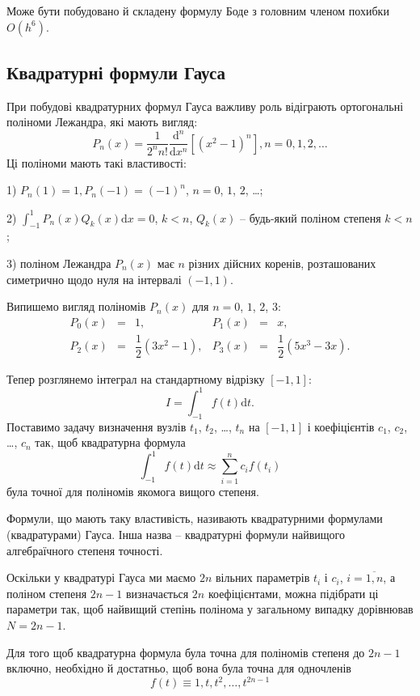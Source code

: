 \documentclass[14pt,twoside]{extreport}
\theoremstyle{mystyle}
\numberwithin{equation}{chapter}
\begin{document}
Може бути побудовано й складену формулу Боде з головним членом похибки $O(h^6)$.

\subsection{Квадратурні формули Гауса}

При побудові квадратурних формул Гауса важливу роль відіграють ортогональні поліноми Лежандра, які мають вигляд:
\[
P_{n}(x)=\frac{1}{2^{n}n!}\frac{\mathrm{d}^{n}}{\mathrm{d}x^{n}}[(x^{2}-1)^{n}], n=0, 1, 2, \ldots
\]
Ці поліноми мають такі властивості:

1) $P_{n}(1)=1, P_{n}(-1)=(-1)^{n}$, $n=0$, $1$, $2$, \ldots;

2) $\displaystyle \int_{-1}^{1}P_{n}(x)Q_{k}(x)\mathrm{d}x=0$, $k<n$, $Q_{k}(x)$ -- будь-який поліном степеня $k<n$;

3) поліном Лежандра $P_n(x)$ має $n$ різних дійсних коренів, розташованих симетрично щодо нуля на інтервалі $(-1, 1)$.

Випишемо вигляд поліномів $P_n(x)$ для $n = 0$, $1$, $2$, $3$:
\[
\begin{array}{llllll}
P_{0}(x) &=& 1, &P_{1}(x) &=& x,\\
P_{2}(x) &=& \dfrac{1}{2}(3x^{2}-1), &P_{3}(x) &=& \dfrac{1}{2}(5x^{3}-3x) .
\end{array}
\] 

Тепер розглянемо інтеграл на стандартному відрізку $[-1, 1]$:
\[
I=\int_{-1}^{1}f(t)\mathrm{d}t.
\]
Поставимо задачу визначення вузлів $t_1$, $t_2$, \ldots, $t_n$ на $[-1, 1]$ і коефіцієнтів $c_1$, $c_2$, \ldots, $c_n$ так, щоб квадратурна формула
\[
\int_{-1}^{1}f(t)\mathrm{d}t\approx\sum_{i=1}^{n}c_{i}f(t_{i})
\]
була точної для поліномів якомога вищого степеня.

Формули, що мають таку властивість, називають квадратурними формулами (квадратурами) Гауса. Інша назва -- квадратурні формули найвищого алгебраїчного степеня точності.

Оскільки у квадратурі Гауса ми маємо $2n$ вільних параметрів $t_i$ і $c_i$, $i = \overline{1, n}$, а поліном степеня $2n - 1$ визначається $2n$ коефіцієнтами, можна підібрати ці параметри так, щоб найвищий степінь полінома у загальному випадку дорівнював $N = 2n - 1$.

Для того щоб квадратурна формула була точна для поліномів степеня до $2n - 1$ включно, необхідно й достатньо, щоб вона була точна для одночленів
\[
f(t)\equiv 1, t, t^{2}, \ldots, t^{2n-1}
\]
\end{document}
